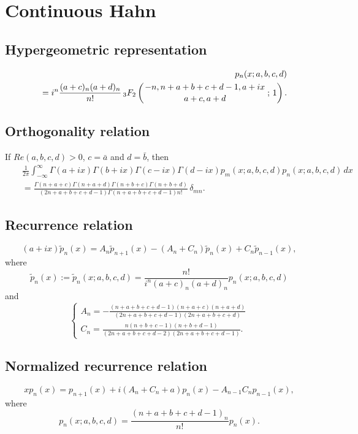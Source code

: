 \documentclass[envcountchap,graybox]{svmono}
\newcommand{\hyp}[5]{\mbox{}_{#1}{F}_{#2}
\left(\genfrac{}{}{0pt}{}{#3}{#4}\,;\,#5\right)}
\renewcommand{\Gamma}{\varGamma}
\begin{document}
\section{Continuous Hahn}

\par\setcounter{equation}{0}

\subsection*{Hypergeometric representation}
\begin{eqnarray}
\label{DefContHahn}
& &p_n(x;a,b,c,d)\nonumber\\
& &{}=i^n\frac{(a+c)_n(a+d)_n}{n!}\,\hyp{3}{2}{-n,n+a+b+c+d-1,a+ix}{a+c,a+d}{1}.
\end{eqnarray}

\subsection*{Orthogonality relation}
If $Re(a,b,c,d)>0$, $c=\bar{a}$ and $d=\bar{b}$, then
\begin{eqnarray}
\label{OrtContHahn}
& &\frac{1}{2\pi}\int_{-\infty}^{\infty}\Gamma(a+ix)\Gamma(b+ix)\Gamma(c-ix)\Gamma(d-ix)
p_m(x;a,b,c,d)p_n(x;a,b,c,d)\,dx\nonumber\\
& &{}=\frac{\Gamma(n+a+c)\Gamma(n+a+d)\Gamma(n+b+c)\Gamma(n+b+d)}
{(2n+a+b+c+d-1)\Gamma(n+a+b+c+d-1)n!}\,\delta_{mn}.
\end{eqnarray}

\subsection*{Recurrence relation}
\begin{equation}
\label{RecContHahn}
(a+ix)\tilde{p}_n(x)=A_n\tilde{p}_{n+1}(x)-\left(A_n+C_n\right)\tilde{p}_n(x)+C_n\tilde{p}_{n-1}(x),
\end{equation}
where
$$\tilde{p}_n(x):=\tilde{p}_n(x;a,b,c,d)=\frac{n!}{i^n(a+c)_n(a+d)_n}p_n(x;a,b,c,d)$$
and
$$\left\{\begin{array}{l}
\displaystyle A_n=-\frac{(n+a+b+c+d-1)(n+a+c)(n+a+d)}{(2n+a+b+c+d-1)(2n+a+b+c+d)}\\[5mm]
\displaystyle C_n=\frac{n(n+b+c-1)(n+b+d-1)}{(2n+a+b+c+d-2)(2n+a+b+c+d-1)}.
\end{array}\right.$$

\subsection*{Normalized recurrence relation}
\begin{equation}
\label{NormRecContHahn}
xp_n(x)=p_{n+1}(x)+i(A_n+C_n+a)p_n(x)-A_{n-1}C_np_{n-1}(x),
\end{equation}
where
$$p_n(x;a,b,c,d)=\frac{(n+a+b+c+d-1)_n}{n!}p_n(x).$$
\end{document}
